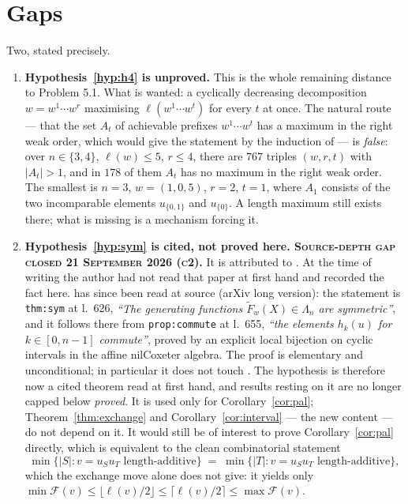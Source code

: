 \documentclass[11pt]{article}
\theoremstyle{definition}
\begin{document}
\section{Gaps}\label{sec:gaps}

Two, stated precisely.

\begin{enumerate}
\item \textbf{Hypothesis~\ref{hyp:h4} is unproved.} This is the whole remaining distance to
Problem 5.1. What is wanted: a cyclically decreasing decomposition
$w=w^1\cdots w^r$ maximising $\ell(w^1\cdots w^t)$ for every $t$ at once. The natural route ---
that the set $A_t$ of achievable prefixes $w^1\cdots w^t$ has a maximum in the right weak order,
which would give the statement by the induction of \cite[Lem.~5.2(3)]{Clio2026} --- is
\emph{false}: over $n\in\{3,4\}$, $\ell(w)\le5$, $r\le4$, there are $767$ triples $(w,r,t)$ with
$|A_t|>1$, and in $178$ of them $A_t$ has no maximum in the right weak order. The smallest is
$n=3$, $w=(1,0,5)$, $r=2$, $t=1$, where $A_1$ consists of the two incomparable elements
$u_{\{0,1\}}$ and $u_{\{0\}}$. A length maximum still exists there; what is missing is a
mechanism forcing it.
\item \textbf{Hypothesis~\ref{hyp:sym} is cited, not proved here. \textsc{Source-depth gap
closed 21 September 2026 (c2).}} It is attributed to \cite{Lam2006}. At the time of writing
the author had not read that paper at first hand and recorded the fact here. \cite{Lam2006}
has since been read at source (arXiv long version): the statement is \texttt{thm:sym} at
l.~626, \emph{``The generating functions $\widetilde F_w(X)\in\Lambda_n$ are symmetric''}, and
it follows there from \texttt{prop:commute} at l.~655, \emph{``the elements $h_k(u)$ for
$k\in[0,n-1]$ commute''}, proved by an explicit local bijection on cyclic intervals in the
affine nilCoxeter algebra. The proof is elementary and unconditional; in particular it does
not touch \cite[Cor.~8.5]{Lam2008}. The hypothesis is therefore now a cited theorem read at
first hand, and results resting on it are no longer capped below \emph{proved}. It is used
only for Corollary~\ref{cor:pal}; Theorem~\ref{thm:exchange} and Corollary~\ref{cor:interval}
--- the new content --- do not depend on it. It would still be of interest to prove
Corollary~\ref{cor:pal} directly, which is
equivalent to the clean combinatorial statement
\[
  \min\{|S| : v=u_Su_T \text{ length-additive}\}\;=\;\min\{|T| : v=u_Su_T \text{ length-additive}\},
\]
which the exchange move alone does not give: it yields only
$\min\mathcal F(v)\le\lfloor\ell(v)/2\rfloor\le\lceil\ell(v)/2\rceil\le\max\mathcal F(v)$.
\end{enumerate}
\end{document}
